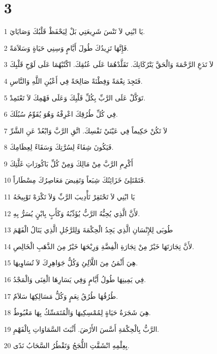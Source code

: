 \chapter{3}

\par 1 يَا ابْنِي لاَ تَنْسَ شَرِيعَتِي بَلْ لِيَحْفَظْ قَلْبُكَ وَصَايَايَ.
\par 2 فَإِنَّهَا تَزِيدُكَ طُولَ أَيَّامٍ وَسِنِي حَيَاةٍ وَسَلاَمَةً.
\par 3 لاَ تَدَعِ الرَّحْمَةَ وَالْحَقَّ يَتْرُكَانِكَ. تَقَلَّدْهُمَا عَلَى عُنُقِكَ. اكْتُبْهُمَا عَلَى لَوْحِ قَلْبِكَ
\par 4 فَتَجِدَ نِعْمَةً وَفِطْنَةً صَالِحَةً فِي أَعْيُنِ اللَّهِ وَالنَّاسِ.
\par 5 تَوَكَّلْ عَلَى الرَّبِّ بِكُلِّ قَلْبِكَ وَعَلَى فَهْمِكَ لاَ تَعْتَمِدْ.
\par 6 فِي كُلِّ طُرُقِكَ اعْرِفْهُ وَهُوَ يُقَوِّمُ سُبُلَكَ.
\par 7 لاَ تَكُنْ حَكِيماً فِي عَيْنَيْ نَفْسِكَ. اتَّقِ الرَّبَّ وَابْعُدْ عَنِ الشَّرِّ
\par 8 فَيَكُونَ شِفَاءً لِسُرَّتِكَ وَسَقَاءً لِعِظَامِكَ.
\par 9 أَكْرِمِ الرَّبَّ مِنْ مَالِكَ وَمِنْ كُلِّ بَاكُورَاتِ غَلَّتِكَ
\par 10 فَتَمْتَلِئَ خَزَائِنُكَ شِبَعاً وَتَفِيضَ مَعَاصِرُكَ مِسْطَاراً.
\par 11 يَا ابْنِي لاَ تَحْتَقِرْ تَأْدِيبَ الرَّبِّ وَلاَ تَكْرَهْ تَوْبِيخَهُ
\par 12 لأَنَّ الَّذِي يُحِبُّهُ الرَّبُّ يُؤَدِّبُهُ وَكَأَبٍ بِابْنٍ يُسَرُّ بِهِ.
\par 13 طُوبَى لِلإِنْسَانِ الَّذِي يَجِدُ الْحِكْمَةَ وَلِلرَّجُلِ الَّذِي يَنَالُ الْفَهْمَ
\par 14 لأَنَّ تِجَارَتَهَا خَيْرٌ مِنْ تِجَارَةِ الْفِضَّةِ وَرِبْحَهَا خَيْرٌ مِنَ الذَّهَبِ الْخَالِصِ.
\par 15 هِيَ أَثْمَنُ مِنَ اللَّآلِئِ وَكُلُّ جَوَاهِرِكَ لاَ تُسَاوِيهَا.
\par 16 فِي يَمِينِهَا طُولُ أَيَّامٍ وَفِي يَسَارِهَا الْغِنَى وَالْمَجْدُ.
\par 17 طُرُقُهَا طُرُقُ نِعَمٍ وَكُلُّ مَسَالِكِهَا سَلاَمٌ.
\par 18 هِيَ شَجَرَةُ حَيَاةٍ لِمُمْسِكِيهَا وَالْمُتَمَسِّكُ بِهَا مَغْبُوطٌ.
\par 19 الرَّبُّ بِالْحِكْمَةِ أَسَّسَ الأَرْضَ. أَثْبَتَ السَّمَاوَاتِ بِالْفَهْمِ.
\par 20 بِعِلْمِهِ انْشَقَّتِ اللُّجَجُ وَتَقْطُرُ السَّحَابُ نَدًى.

